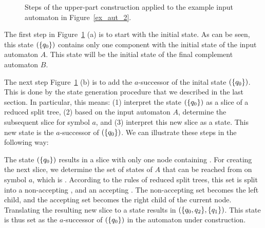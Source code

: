 \begin{figure}[htb]
\centering
  \begin{subfigure}[t]{0.49\textwidth}
  \centering
  \UpperPartA
  \caption{}
  \end{subfigure}
  \hfill
  \begin{subfigure}[t]{0.49\textwidth}
  \centering
  \UpperPartB
  \caption{}
  \end{subfigure}

  \begin{subfigure}[t]{0.49\textwidth}
  \centering
  \UpperPartC
  \caption{}
  \end{subfigure}
  \hfill
  \begin{subfigure}[t]{0.49\textwidth}
  \centering
  \UpperPartD
  \caption{}
  \end{subfigure}
\caption{Steps of the upper-part construction applied to the example input automaton in Figure~\ref{ex_aut_2}.}
\label{steps_upper}
\end{figure}

The first step in Figure~\ref{steps_upper} (a) is to start with the initial state. As can be seen, this state $(\{q_{0}\})$ contains only one component with the initial state of the input automaton $A$. This state will be the initial state of the final complement automaton $B$.

The next step Figure~\ref{steps_upper} (b) is to add the $a$-successor of the inital state $(\{q_{0}\})$. This is done by the state generation procedure that we described in the last section. In particular, this means: (1) interpret the state $(\{q_{0}\})$ as a slice of a reduced split tree, (2) based on the input automaton $A$, determine the subsequent slice for symbol $a$, and (3) interpret this new slice as a state. This new state is the $a$-successor of $(\{q_{0}\})$. We can illustrate these steps in the following way:

\begin{center}
\SlicesOne
\end{center}

The state $(\{q_{0}\})$ results in a slice with only one node containing . For creating the next slice, we determine the set of states of $A$ that can be reached from  on symbol $a$, which is . According to the rules of reduced split trees, this set is split into a non-accepting , and an accepting . The non-accepting set  becomes the left child, and the accepting set  becomes the right child of the current node. Translating the resulting new slice to a state results in $(\{q_{0},q_{2}\}, \{q_{1}\})$. This state is thus set as the $a$-successor of $(\{q_{0}\})$ in the automaton under construction.

